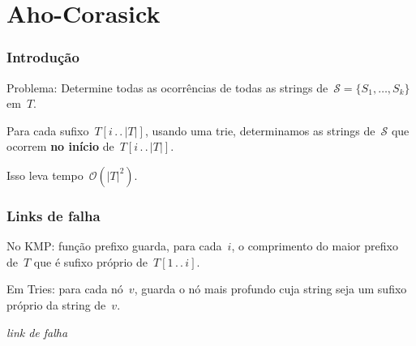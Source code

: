 \documentclass[10pt, compress]{beamer}
\newcommand{\tdots}{\,.\,.\,} %
\newcommand{\Oh}{\mathcal{O}}
\newcommand{\cS}{\mathcal{S}}
\begin{document}
\section{Aho-Corasick}

\begin{frame}[fragile]
\frametitle{Introdução}

\alert{Problema:} Determine todas as ocorrências de todas as strings de~$\cS = \{S_1, \ldots, S_k\}$ em~$T$.
\vspace{2ex}

\pause

Para cada sufixo~$T[i\tdots |T|]$, usando uma trie, determinamos as strings de~$\cS$ que ocorrem \textbf{no início} de~$T[i\tdots |T|]$.

Isso leva tempo~$\Oh(|T|^2)$.

\end{frame}

\begin{frame}[fragile]
\frametitle{Links de falha}

No KMP: função prefixo guarda, para cada~$i$, o comprimento do maior prefixo de~$T$ que é sufixo próprio de~$T[1\tdots i]$.

\begin{center}
\end{center}

\pause
Em Tries: para cada nó~$v$, guarda o nó mais profundo cuja string seja um sufixo próprio da string de~$v$.

\begin{center}
\emph{\huge link de falha}
\end{center}


\end{frame}
\end{document}
